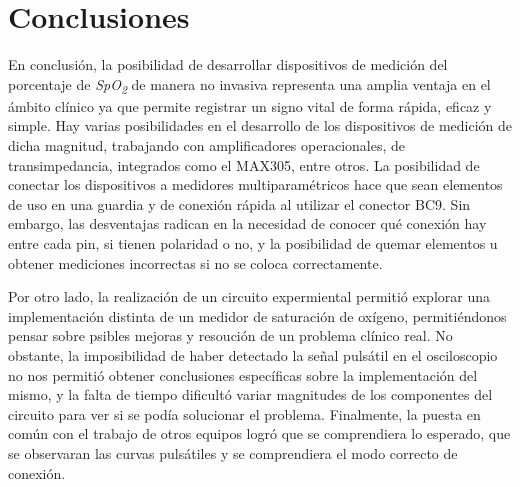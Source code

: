 \section{Conclusiones}

En conclusión, la posibilidad de desarrollar dispositivos de medición del porcentaje de \textit{SpO\textsubscript{2}} de manera no invasiva representa una amplia ventaja en el ámbito
clínico ya que permite registrar un signo vital de forma rápida, eficaz y simple. Hay varias posibilidades en el desarrollo de los dispositivos de medición de dicha magnitud, trabajando con amplificadores operacionales,
de transimpedancia, integrados como el MAX305, entre otros. 
La posibilidad de conectar los dispositivos a medidores multiparamétricos hace que sean elementos de uso en una guardia y de conexión rápida al utilizar el conector BC9. Sin embargo, las desventajas radican en la necesidad de conocer qué conexión hay entre 
cada pin, si tienen polaridad o no, y la posibilidad de quemar elementos u obtener mediciones incorrectas si no se coloca correctamente. 

Por otro lado, la realización de un circuito expermiental permitió explorar una implementación distinta de un medidor de saturación de oxígeno, permitiéndonos pensar sobre psibles mejoras y resoución de un problema clínico real. No obstante, la imposibilidad de haber 
detectado la señal pulsátil en el osciloscopio no nos permitió obtener conclusiones específicas sobre la implementación del mismo, y la falta de tiempo dificultó variar magnitudes de los componentes del circuito para ver si se podía solucionar el problema.
Finalmente, la puesta en común con el trabajo de otros equipos logró que se comprendiera lo esperado, que se observaran las curvas pulsátiles y se comprendiera el modo correcto de conexión.